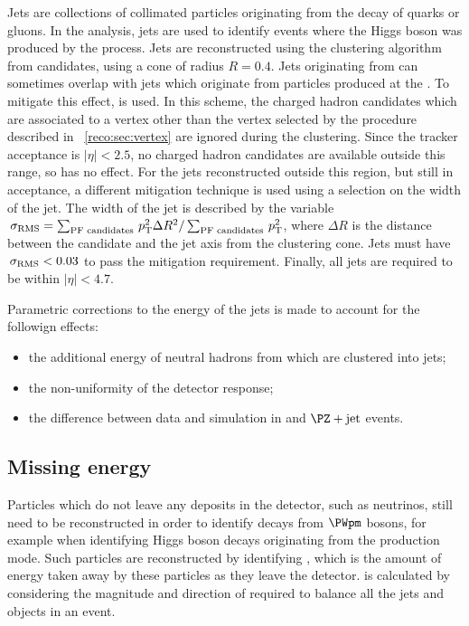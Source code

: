 Jets are collections of collimated particles originating from the decay of quarks or gluons. In the \Hgg analysis, jets are used to identify events where the Higgs boson was produced by the \VBF process. 
Jets are reconstructed using the \antiKt clustering algorithm~\cite{antiKt} from \PF candidates, using a cone of radius $R=0.4$. Jets originating from \PU can sometimes overlap with jets which originate from particles produced at the \PV. To mitigate this effect, \PFCHS is used. In this scheme, the \PF charged hadron candidates which are associated to a vertex other than the vertex selected by the procedure described in \Sec~\ref{reco:sec:vertex} are ignored during the clustering. %
Since the tracker acceptance is $|\eta|<2.5$, no \PF charged hadron candidates are available outside this range, so \PFCHS has no effect. For the jets reconstructed outside this region, but still in acceptance, a different \PU mitigation technique is used using a selection on the width of the jet. The width of the jet is described by the variable $\,\sigma_{\text{RMS}}= \sum_{\text{PF candidates}}\,p_\text{T}^2 \Delta R^2/ \sum_{\text{PF candidates}}\,p_\text{T}^2  $, where $\Delta R$ is the distance between the \PF candidate and the jet axis from the clustering cone. Jets must have $\,\sigma_{\text{RMS}}<0.03$ to pass the \PU mitigation requirement. Finally, all jets are required to be within  $|\eta|<4.7$.

Parametric corrections to the energy of the jets is made to account for the followign effects:
\begin{itemize}
\item the additional energy of \PF neutral hadrons from \PU which are clustered into jets; 
\item the non-uniformity of the detector response;
\item the difference between data and simulation in \gammaJet and $\PZ+\text{jet}$ events.
\end{itemize}


\subsection{Missing energy}

Particles which do not leave any deposits in the detector, such as neutrinos, still need to be reconstructed in order to identify decays from $\PWpm$ bosons, for example when identifying Higgs boson decays originating from the \WH production mode. Such particles are reconstructed by identifying \MET, which is the amount of energy taken away by these particles as they leave the detector. \MET is calculated by considering the magnitude and direction of \pT required to balance all the jets and \PF objects in an event.



